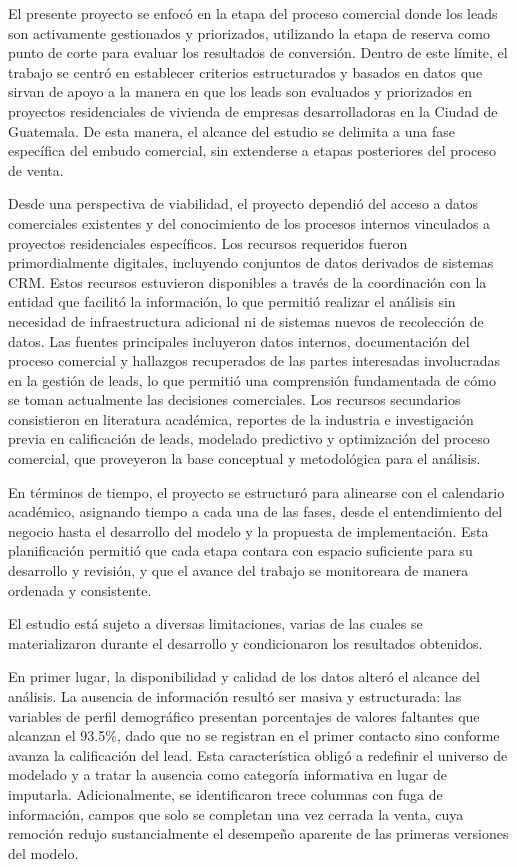 El presente proyecto se enfocó en la etapa del proceso comercial donde los leads son activamente gestionados y priorizados, utilizando la etapa de reserva como punto de corte para evaluar los resultados de conversión. Dentro de este límite, el trabajo se centró en establecer criterios estructurados y basados en datos que sirvan de apoyo a la manera en que los leads son evaluados y priorizados en proyectos residenciales de vivienda de empresas desarrolladoras en la Ciudad de Guatemala. De esta manera, el alcance del estudio se delimita a una fase específica del embudo comercial, sin extenderse a etapas posteriores del proceso de venta.

Desde una perspectiva de viabilidad, el proyecto dependió del acceso a datos comerciales existentes y del conocimiento de los procesos internos vinculados a proyectos residenciales específicos. Los recursos requeridos fueron primordialmente digitales, incluyendo conjuntos de datos derivados de sistemas CRM. Estos recursos estuvieron disponibles a través de la coordinación con la entidad que facilitó la información, lo que permitió realizar el análisis sin necesidad de infraestructura adicional ni de sistemas nuevos de recolección de datos. Las fuentes principales incluyeron datos internos, documentación del proceso comercial y hallazgos recuperados de las partes interesadas involucradas en la gestión de leads, lo que permitió una comprensión fundamentada de cómo se toman actualmente las decisiones comerciales. Los recursos secundarios consistieron en literatura académica, reportes de la industria e investigación previa en calificación de leads, modelado predictivo y optimización del proceso comercial, que proveyeron la base conceptual y metodológica para el análisis.

En términos de tiempo, el proyecto se estructuró para alinearse con el calendario académico, asignando tiempo a cada una de las fases, desde el entendimiento del negocio hasta el desarrollo del modelo y la propuesta de implementación. Esta planificación permitió que cada etapa contara con espacio suficiente para su desarrollo y revisión, y que el avance del trabajo se monitoreara de manera ordenada y consistente.

El estudio está sujeto a diversas limitaciones, varias de las cuales se materializaron durante el desarrollo y condicionaron los resultados obtenidos.

En primer lugar, la disponibilidad y calidad de los datos alteró el alcance del análisis. La ausencia de información resultó ser masiva y estructurada: las variables de perfil demográfico presentan porcentajes de valores faltantes que alcanzan el 93.5\%, dado que no se registran en el primer contacto sino conforme avanza la calificación del lead. Esta característica obligó a redefinir el universo de modelado y a tratar la ausencia como categoría informativa en lugar de imputarla. Adicionalmente, se identificaron trece columnas con fuga de información, campos que solo se completan una vez cerrada la venta, cuya remoción redujo sustancialmente el desempeño aparente de las primeras versiones del modelo.


